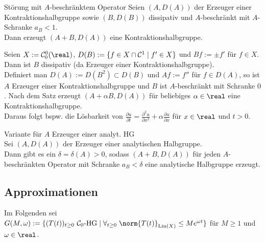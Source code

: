 \begin{Satz}{Störung mit $A$-beschränktem Operator}
    Seien $(A, D(A))$ der Erzeuger einer Kontraktionshalbgruppe sowie
    $(B, D(B))$ dissipativ und $A$-beschränkt mit $A$-Schranke $a_B < 1$.\\
    Dann erzeugt $(A + B, D(A))$ eine Kontraktionshalbgruppe.
\end{Satz}

\begin{Bsp}
    Seien $X := \C_0^0(\real)$, $D(B) := \{f \in X \cap \mathcal{C}^1 \;|\; f' \in X\}$ und
    $Bf := \pm f'$ für $f \in X$.\\
    Dann ist $B$ dissipativ (da Erzeuger einer Kontraktionshalbgruppe).\\
    Definiert man $D(A) := D(B^2) \subset D(B)$ und $Af := f''$ für $f \in D(A)$,
    so ist $A$ Erzeuger einer Kontraktionshalbgruppe und
    $B$ ist $A$-beschränkt mit Schranke $0$.
    Nach dem Satz erzeugt $(A + \alpha B, D(A))$ für beliebiges $\alpha \in \real$ eine
    Kontraktionshalbgruppe.\\
    Daraus folgt bspw. die Lösbarkeit von
    $\frac{\partial u}{\partial t} =
    \frac{\partial^2 u}{\partial x^2} + \alpha \frac{\partial u}{\partial x}$
    für $x \in \real$ und $t > 0$.
\end{Bsp}

\linie

\begin{Satz}{Variante für $A$ Erzeuger einer analyt. HG}\\
    Sei $(A, D(A))$ der Erzeuger einer analytischen Halbgruppe.\\
    Dann gibt es ein $\delta = \delta(A) > 0$, sodass
    $(A + B, D(A))$ für jeden $A$-beschränkten Operator mit Schranke $a_B < \delta$
    eine analytische Halbgruppe erzeugt.
\end{Satz}

\pagebreak

\subsection{%
    Approximationen%
}

\begin{Bem}
    Im Folgenden sei $G(M, \omega) := \{\text{$(T(t))_{t \ge 0}$ $\C_0$-HG} \;|\;
    \forall_{t \ge 0}\; \norm{T(t)}_{\Lin(X)} \le Me^{\omega t}\}$
    für $M \ge 1$ und $\omega \in \real$.
\end{Bem}

